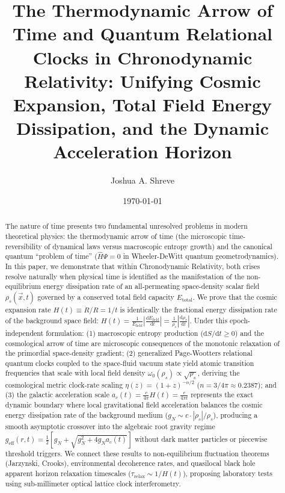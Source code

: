 \documentclass[aps,prd,reprint,superscriptaddress,nofootinbib,floatfix,amsmath,amssymb]{revtex4-2}
\begin{document}
\title{The Thermodynamic Arrow of Time and Quantum Relational Clocks in Chronodynamic Relativity: Unifying Cosmic Expansion, Total Field Energy Dissipation, and the Dynamic Acceleration Horizon}

\author{Joshua A. Shreve}

\date{\today}

\begin{abstract}
The nature of time presents two fundamental unresolved problems in modern theoretical physics: the thermodynamic arrow of time (the microscopic time-reversibility of dynamical laws versus macroscopic entropy growth) and the canonical quantum ``problem of time'' ($\hat{H}\Psi = 0$ in Wheeler-DeWitt quantum geometrodynamics). In this paper, we demonstrate that within Chronodynamic Relativity, both crises resolve naturally when physical time is identified as the manifestation of the non-equilibrium energy dissipation rate of an all-permeating space-density scalar field $\rho_s(\vec{x}, t)$ governed by a conserved total field capacity $E_{\text{total}}$. We prove that the cosmic expansion rate $H(t) \equiv \dot{R}/R = 1/t$ is identically the fractional energy dissipation rate of the background space field: $H(t) = \frac{1}{E_{\text{field}}}|\frac{\mathrm{d}E_{\text{field}}}{\mathrm{d}t}| = \frac{1}{\rho_s}|\frac{\mathrm{d}\rho_s}{\mathrm{d}t}|$. Under this epoch-independent formulation: (1) macroscopic entropy production ($\mathrm{d}S/\mathrm{d}t \ge 0$) and the cosmological arrow of time are microscopic consequences of the monotonic relaxation of the primordial space-density gradient; (2) generalized Page-Wootters relational quantum clocks coupled to the space-fluid vacuum state yield atomic transition frequencies that scale with local field density $\omega_0(\rho_s) \propto \sqrt{\rho_s}$, deriving the cosmological metric clock-rate scaling $\eta(z) = (1+z)^{-n/2}$ ($n = 3/4\pi \approx 0.2387$); and (3) the galactic acceleration scale $a_c(t) = \frac{c}{4\pi} H(t) = \frac{c}{4\pi t}$ represents the exact dynamic boundary where local gravitational field acceleration balances the cosmic energy dissipation rate of the background medium ($g_N \sim c \cdot |\dot{\rho}_s|/\rho_s$), producing a smooth asymptotic crossover into the algebraic root gravity regime $g_{\text{eff}}(r, t) = \frac{1}{2}[g_N + \sqrt{g_N^2 + 4 g_N a_c(t)}]$ without dark matter particles or piecewise threshold triggers. We connect these results to non-equilibrium fluctuation theorems (Jarzynski, Crooks), environmental decoherence rates, and quasilocal black hole apparent horizon relaxation timescales ($\tau_{\text{relax}} \sim 1/H(t)$), proposing laboratory tests using sub-millimeter optical lattice clock interferometry.
\end{abstract}
\end{document}
